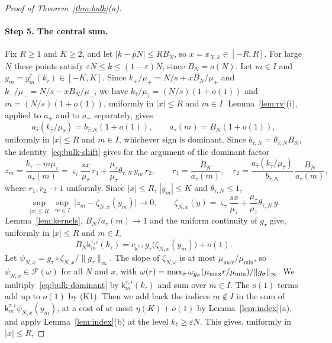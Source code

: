 \begin{proof}[Proof of Theorem~\ref{thm:bulk}(a)]
\paragraph{Step 5. The central sum.}
Fix $R\ge1$ and $K\ge2$, and let $|k-pN|\le RB_N$, so $x=x_{N,k}\in[-R,R]$. For large
$N$ these points satisfy $\varepsilon N\le k\le(1-\varepsilon)N$, since $B_N=o(N)$. Let
$m\in I$ and $y_m=y^{\bar\tau}_m(k_{\bar\tau})\in[-K,K]$. Since
$k_\plus/\mu_\plus=N/s+xB_N/\mu_\plus$ and $k_\minus/\mu_\minus=N/s-xB_N/\mu_\minus$, we have
$k_{\bar\tau}/\mu_{\bar\tau}=(N/s)(1+o(1))$ and $m=(N/s)(1+o(1))$, uniformly in $|x|\le R$
and $m\in I$. Lemma~\ref{lem:rv}(i), applied to $a_\plus$ and to $a_\minus$ separately,
gives
\[
 a_{\bar\tau}(k_{\bar\tau}/\mu_{\bar\tau})=b_{\bar\tau,N}(1+o(1)),\qquad a_\tau(m)=B_N(1+o(1)),
\]
uniformly in $|x|\le R$ and $m\in I$, whichever sign is dominant. Since
$b_{\bar\tau,N}=\theta_{\bar\tau,N}B_N$, the identity~\eqref{eq:bulk-shift} gives for the
argument of the dominant factor
\[
 z_m=\frac{k_\tau-m\mu_\tau}{a_\tau(m)}
 =\varsigma_\tau\frac{sx}{\mu_{\bar\tau}}\,r_{1}
 +\frac{\mu_\tau}{\mu_{\bar\tau}}\theta_{\bar\tau,N}\,y_m\,r_{2},\qquad
 r_1=\frac{B_N}{a_\tau(m)},\quad r_2=\frac{a_{\bar\tau}(k_{\bar\tau}/\mu_{\bar\tau})}{b_{\bar\tau,N}}\,\frac{B_N}{a_\tau(m)} ,
\]
where $r_1,r_2\to1$ uniformly. Since $|x|\le R$, $|y_m|\le K$ and $\theta_{\bar\tau,N}\le1$,
\[
 \sup_{|x|\le R}\ \sup_{m\in I}\ \bigl|z_m-\zeta_{N,x}(y_m)\bigr|\to0,\qquad
 \zeta_{N,x}(y)=\varsigma_\tau\frac{sx}{\mu_{\bar\tau}}+\frac{\mu_\tau}{\mu_{\bar\tau}}\theta_{\bar\tau,N}\,y .
\]
Lemma~\ref{lem:kernels}, $B_N/a_\tau(m)\to1$ and the uniform continuity of $g_\tau$ give,
uniformly in $|x|\le R$ and $m\in I$,
\begin{equation}\label{eq:bulk-dominant}
 B_N\mathsf k^{\tau,i}_m(k_\tau)=c_{\mathsf k^{\tau,i}}\,g_\tau\bigl(\zeta_{N,x}(y_m)\bigr)+o(1).
\end{equation}
Let $\psi_{N,x}=g_\tau\circ\zeta_{N,x}/\|g_\tau\|_\infty$. The slope of $\zeta_{N,x}$ is at most
$\mu_{\max}/\mu_{\min}$, so $\psi_{N,x}\in\mathcal F(\omega)$ for all $N$ and $x$, with
$\omega(r)=\max_\sigma\omega_{g_\sigma}(\mu_{\max}r/\mu_{\min})/\|g_\sigma\|_\infty$. We
multiply~\eqref{eq:bulk-dominant} by $\mathsf k^{\bar\tau,i}_m(k_{\bar\tau})$ and sum over
$m\in I$. The $o(1)$ terms add up to $o(1)$ by (K1). Then we add back the indices
$m\notin I$ in the sum of $\mathsf k^{\bar\tau,i}_m\psi_{N,x}(y_m)$, at a cost of at most
$\eta(K)+o(1)$ by Lemma~\ref{lem:index}(a), and apply Lemma~\ref{lem:index}(b) at the
level $k_{\bar\tau}\ge\varepsilon N$. This gives, uniformly in $|x|\le R$,

\end{proof}
